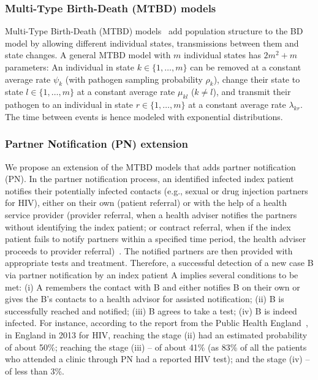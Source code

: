 \documentclass[10pt,letterpaper]{article}
\begin{document}
\subsubsection*{Multi-Type Birth-Death (MTBD) models}
Multi-Type Birth-Death (MTBD) models~\cite{Stadler2013a} add population structure to the BD model by allowing different individual states, transmissions between them and state changes. A general MTBD model with $m$ individual states has $2m^2 + m$ parameters: An individual in state $k \in \{1, \ldots, m\}$ can be removed at a constant average rate $\psi_k$ (with pathogen sampling probability $\rho_k$), change their state to state $l \in \{1, \ldots, m\}$ at a constant average rate $\mu_{kl}$ ($k \neq l$), and transmit their pathogen to an individual in state $r \in \{1, \ldots, m\} $ at a constant average rate $\lambda_{kr}$. The time between events %
is hence modeled with exponential distributions.


\subsubsection*{Partner Notification (PN) extension}

We propose an %
extension of the MTBD models that adds partner notification (PN).  
In the partner notification process, an identified infected index patient notifies their potentially infected contacts (e.g., sexual or drug injection partners for HIV), either on their own (patient referral) or with the help of a health service provider (provider referral, when a health adviser notifies the partners without identifying the index patient; or contract referral, when if the index patient fails to notify partners within a specified time period, the health adviser proceeds to provider referral)~\cite{wardPartnerNotification2014}. The notified partners are then provided with appropriate tests and treatment. Therefore, a successful detection of a new case B via partner notification by an index patient A implies several conditions to be met: (i) A remembers the contact with B and  either notifies B on their own or gives the B's contacts to a health advisor for assisted notification; (ii) B is successfully reached and notified; (iii) B agrees to take a test; (iv) B is indeed infected. 
For instance, according to the report from the Public Health England~\cite{aHIVUnitedKingdom2014}, in England in 2013 for HIV, reaching the stage (ii) had an estimated probability of about 50\%; reaching the stage (iii) -- of about 41\% (as 83\% of all the patients who attended a clinic through PN had a reported HIV test); and the stage (iv) -- of less than 3\%.
\end{document}
